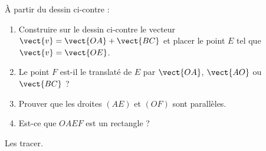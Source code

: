 
\begin{exercice}\label{exosmath-0676}

\begin{wrapfigure}{r}{8.0cm}
   \vspace{-0.5cm}        %
   \centering                                                                                                                               
                                                                                                                
\end{wrapfigure}

À partir du dessin ci-contre :
    \begin{enumerate}
        \item
            Construire sur le dessin ci-contre le vecteur \( \vect{ v }=\vect{ OA }+\vect{ BC }\) et placer le point \( E\) tel que \( \vect{ v }=\vect{ OE }\).
        \item
            Le point \( F\) est-il le translaté de \( E\) par \( \vect{ OA }\), \( \vect{ AO }\) ou \( \vect{ BC }\) ?
        \item
            Prouver que les droites \( (AE)\) et \( (OF)\) sont parallèles.
        \item
            Est-ce que \( OAEF\) est un rectangle ?
    \end{enumerate}
    Les tracer.

\end{exercice}
